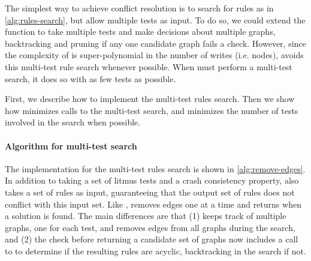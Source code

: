 The simplest way to achieve conflict resolution is to search for rules as in
\autoref{alg:rules-search}, but allow multiple tests as input. To do so, we could
extend the function \graphsearch to take multiple tests and make decisions
about multiple graphs, backtracking and pruning if any one candidate graph fails
a check. However, since the complexity of \graphsearch is super-polynomial 
in the number of writes (i.e. nodes), \depsynth avoids this multi-test rule search
whenever possible. When \depsynth must perform a multi-test search, it does so with
as few tests as possible.

First, we describe how to implement the multi-test rules search. Then we show how \depsynth
minimizes calls to the multi-test search, and minimizes the number of tests involved
in the search when possible.

\paragraph{Algorithm for multi-test search}
The implementation for the multi-test rules search is shown in \autoref{alg:remove-edges}.
In addition to taking a set of litmus tests and a crash consistency property,
\multisearch also takes a set of rules as input, guaranteeing that the output
set of rules does not conflict with this input set.
Like \graphsearch, \multisearch removes edges one at a time and returns when a solution
is found. The main differences are that (1) \multisearch keeps track of multiple graphs,
one for each test, and removes edges from all graphs during the search, and
(2) the check before returning a candidate set of graphs now includes
a call to \genrules to determine if the resulting rules are acyclic,
backtracking in the search if not.

